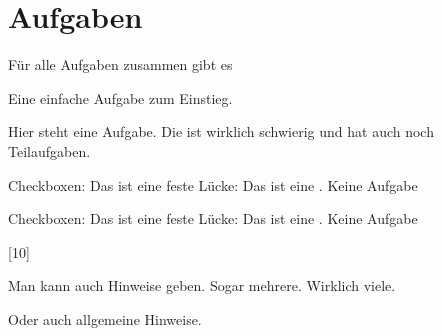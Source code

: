 \documentclass[a4paper]{scrartcl}
\begin{document}
\section*{Aufgaben}Für alle Aufgaben zusammen gibt es \punkteTotal
    \begin{aufgabe}[points=2,bonus-points=1]
        Eine einfache Aufgabe zum Einstieg.
    \end{aufgabe}
    \begin{aufgabe}
        Hier steht eine Aufgabe. Die ist wirklich schwierig und hat auch noch Teilaufgaben.
        \begin{teilaufgaben}
            \teilaufgabe Checkboxen: \chb\chb\chb*\chb\chb*
            \teilaufgabe Das ist eine feste Lücke: \luecke[style=\uwave{#1}]{2cm}
            \teilaufgabe Das ist eine .
            \teilaufgabe Keine Aufgabe
        \end{teilaufgaben}
        \begin{loesung}
            \begin{teilaufgaben}
                \teilaufgabe Checkboxen: \chb\chb\chb*\chb\chb*
                \teilaufgabe Das ist eine feste Lücke: \luecke[style=\uwave{#1}]{2cm}
                \teilaufgabe Das ist eine .
                \teilaufgabe Keine Aufgabe
            \end{teilaufgaben}
        \end{loesung}
        \begin{erwartungen}
            [10]
        \end{erwartungen}
        \begin{bearbeitungshinweis}
            \begin{teilaufgaben}
                \teilaufgabe Man kann auch Hinweise geben.
                \teilaufgabe Sogar mehrere.
                \teilaufgabeOhneLoesung
                \teilaufgabe Wirklich viele.
            \end{teilaufgaben}
            Oder auch allgemeine Hinweise.
        \end{bearbeitungshinweis}
    \end{aufgabe}
\end{document}
